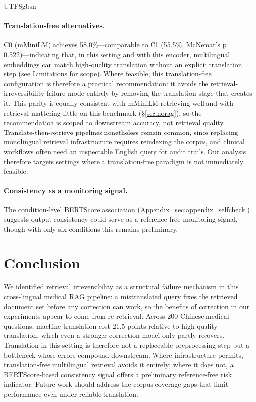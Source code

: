 \documentclass[11pt]{article}
\begin{document}
\begin{CJK}{UTF8}{gbsn}
\paragraph{Translation-free alternatives.}
C0 (mMiniLM) achieves 58.0\%---comparable to C1 (55.5\%, McNemar's p = 0.522)---indicating that, in this setting and with this encoder, multilingual embeddings can match high-quality translation without an explicit translation step (see Limitations for scope). Where feasible, this translation-free configuration is therefore a practical recommendation: it avoids the retrieval-irreversibility failure mode entirely by removing the translation stage that creates it. This parity is equally consistent with mMiniLM retrieving well and with retrieval mattering little on this benchmark (\S\ref{sec:norag}), so the recommendation is scoped to downstream accuracy, not retrieval quality. Translate-then-retrieve pipelines nonetheless remain common, since replacing monolingual retrieval infrastructure requires reindexing the corpus, and clinical workflows often need an inspectable English query for audit trails. Our analysis therefore targets settings where a translation-free paradigm is not immediately feasible.

\paragraph{Consistency as a monitoring signal.}
The condition-level BERTScore association (Appendix~\ref{sec:appendix_selfcheck}) suggests output consistency could serve as a reference-free monitoring signal, though with only six conditions this remains preliminary.

\section{Conclusion}
We identified retrieval irreversibility as a structural failure mechanism in this cross-lingual medical RAG pipeline: a mistranslated query fixes the retrieved document set before any correction can work, so the benefits of correction in our experiments appear to come from re-retrieval. Across 200 Chinese medical questions, machine translation cost 21.5 points relative to high-quality translation, which even a stronger correction model only partly recovers. Translation in this setting is therefore not a replaceable preprocessing step but a bottleneck whose errors compound downstream. Where infrastructure permits, translation-free multilingual retrieval avoids it entirely; where it does not, a BERTScore-based consistency signal offers a preliminary reference-free risk indicator. Future work should address the corpus coverage gaps that limit performance even under reliable translation.



\end{CJK}
\end{document}
